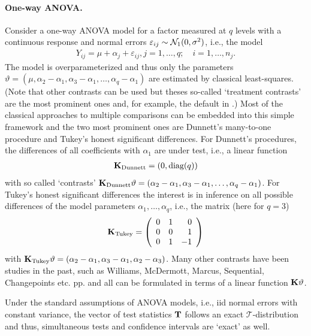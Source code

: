 \documentclass[12pt]{article}
\begin{document}
\paragraph{One-way ANOVA.}

Consider a one-way ANOVA model for a factor measured at $q$ levels
with a continuous response and normal errors $\varepsilon_{ij} \sim \mathcal{N}_1(0, \sigma^2)$, 
i.e., the model
\begin{eqnarray*}
Y_{ij} = \mu + \alpha_{j} + \varepsilon_{ij}, j = 1,\dots,q; \quad i = 1, \dots, n_j.
\end{eqnarray*}
The model is overparameterized and thus only the parameters
$\vartheta = (\mu, \alpha_2 - \alpha_1, \alpha_3 - \alpha_1, \dots, \alpha_q - \alpha_1)$ 
are  estimated by classical least-squares. (Note that other contrasts can be used
but theses so-called `treatment contrasts' are the most prominent ones and,
for example, the default in \RR.) 
Most of the classical approaches
to multiple comparisons can be embedded into this simple framework and 
the two most prominent ones are Dunnett's many-to-one procedure and
Tukey's honest significant differences. For Dunnett's procedures,
the differences of all coefficients with $\alpha_1$ are under test, i.e.,
a linear function
\begin{eqnarray*}
\mathbf{K}_\text{Dunnett} = (0, \text{diag}(q))
\end{eqnarray*}
with so called `contrasts' 
$\mathbf{K}_\text{Dunnett} \vartheta = (\alpha_2 - \alpha_1, \alpha_3 - \alpha_1, \dots, \alpha_q - \alpha_1)$.
For Tukey's honest significant differences the interest is in inference on
all possible differences of the model parameters $\alpha_1, \dots, \alpha_q$, i.e., 
the matrix (here for $q = 3$)
\begin{eqnarray*}
\mathbf{K}_\text{Tukey} = \left( 
\begin{array}{rrr} 0 & 1 & 0 \\
0 & 0 & 1 \\
0 & 1 & -1 
\end{array} \right)
\end{eqnarray*}
with $\mathbf{K}_\text{Tukey} \vartheta = (\alpha_2 - \alpha_1, \alpha_3 - \alpha_1, \alpha_2 - \alpha_3)$.
Many other contrasts have been studies in the past, such as Williams, McDermott, Marcus,
Sequential, Changepoints etc. pp.  and all can be formulated in terms
of a linear function $\mathbf{K} \vartheta$.

Under the standard assumptions of ANOVA models, i.e., iid normal errors with constant
variance, the vector of test statistics $\mathbf{T}$ follows an exact $\mathcal{T}$-distribution and
thus, simultaneous tests and confidence intervals are `exact' as well.
\end{document}
